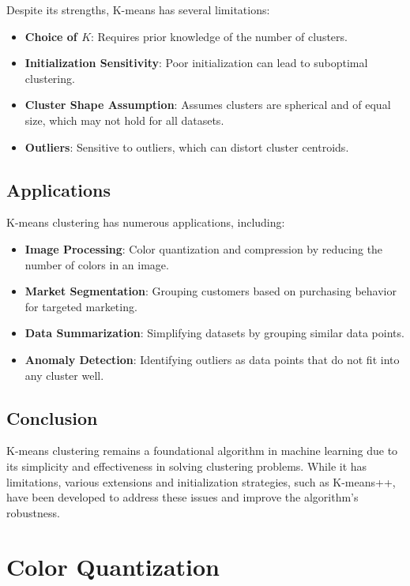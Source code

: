 Despite its strengths, K-means has several limitations:
\begin{itemize}
    \item \textbf{Choice of \( K \)}: Requires prior knowledge of the number of clusters.
    \item \textbf{Initialization Sensitivity}: Poor initialization can lead to suboptimal clustering.
    \item \textbf{Cluster Shape Assumption}: Assumes clusters are spherical and of equal size, which may not hold for all datasets.
    \item \textbf{Outliers}: Sensitive to outliers, which can distort cluster centroids.
\end{itemize}

\subsection{Applications}

K-means clustering has numerous applications, including:
\begin{itemize}
    \item \textbf{Image Processing}: Color quantization and compression by reducing the number of colors in an image.
    \item \textbf{Market Segmentation}: Grouping customers based on purchasing behavior for targeted marketing.
    \item \textbf{Data Summarization}: Simplifying datasets by grouping similar data points.
    \item \textbf{Anomaly Detection}: Identifying outliers as data points that do not fit into any cluster well.
\end{itemize}

\subsection{Conclusion}

K-means clustering remains a foundational algorithm in machine learning due to its simplicity and effectiveness in solving clustering problems. While it has limitations, various extensions and initialization strategies, such as K-means++, have been developed to address these issues and improve the algorithm's robustness.


\section{Color Quantization}

